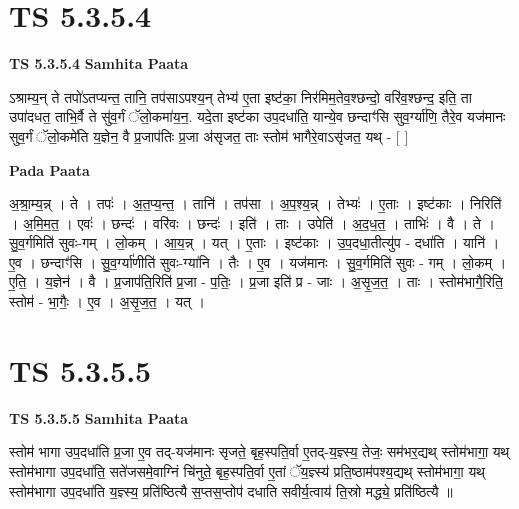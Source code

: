 \documentclass[17pt]{extarticle}
\begin{document}
\section*{ TS 5.3.5.4 }

\textbf{TS 5.3.5.4 } \newline
\textbf{Samhita Paata} \newline

ऽश्राम्य॒न् ते तपो॑ऽतप्यन्त॒ तानि॒ तप॑साऽपश्य॒न् तेभ्य॑ ए॒ता इष्ट॑का॒ निर॑मिम॒तेव॒श्छन्दो॒ वरि॑व॒श्छन्द॒ इति॒ ता उपा॑दधत॒ ताभि॒र्वै ते सु॑व॒र्गं ॅलो॒कमा॑य॒न॒. यदे॒ता इष्ट॑का उप॒दधा॑ति॒ यान्ये॒व छन्दाꣳ॑सि सुव॒र्ग्या॑णि॒ तैरे॒व यज॑मानः सुव॒र्गं ॅलो॒कमे॑ति य॒ज्ञेन॒ वै प्र॒जाप॑तिः प्र॒जा अ॑सृजत॒ ताः स्तोम॑ भागैरे॒वाऽसृ॑जत॒ यथ् - [  ] \newline

\textbf{Pada Paata} \newline

अ॒श्रा॒म्य॒न्न् । ते । तपः॑ । अ॒त॒प्य॒न्त॒ । तानि॑ । तप॑सा । अ॒प॒श्य॒न्न् । तेभ्यः॑ । ए॒ताः । इष्ट॑काः । निरिति॑ । अ॒मि॒म॒त॒ । एवः॑ । छन्दः॑ । वरि॑वः । छन्दः॑ । इति॑ । ताः । उपेति॑ । अ॒द॒ध॒त॒ । ताभिः॑ । वै । ते । सु॒व॒र्गमिति॑ सुवः-गम् । लो॒कम् । आ॒य॒न्न् । यत् । ए॒ताः । इष्ट॑काः । उ॒प॒दधा॒तीत्यु॑प - दधा॑ति । यानि॑ । ए॒व । छन्दाꣳ॑सि । सु॒व॒र्ग्या॑णीति॑ सुवः-ग्या॑नि । तैः । ए॒व । यज॑मानः । सु॒व॒र्गमिति॑ सुवः - गम् । लो॒कम् । ए॒ति॒ । य॒ज्ञेन॑ । वै । प्र॒जाप॑ति॒रिति॑ प्र॒जा - प॒तिः॒ । प्र॒जा इति॑ प्र - जाः । अ॒सृ॒ज॒त॒ । ताः । स्तोम॑भागै॒रिति॒ स्तोम॑ - भा॒गैः॒ । ए॒व । अ॒सृ॒ज॒त॒ । यत् ।  \newline




\section*{ TS 5.3.5.5 }

\textbf{TS 5.3.5.5 } \newline
\textbf{Samhita Paata} \newline

स्तोम॑ भागा उप॒दधा॑ति प्र॒जा ए॒व तद्-यज॑मानः सृजते॒ बृह॒स्पति॒र्वा ए॒तद्-य॒ज्ञ्स्य॒ तेजः॒ सम॑भर॒द्यथ् स्तोम॑भागा॒ यथ् स्तोम॑भागा उप॒दधा॑ति॒ सते॑जसमे॒वाग्निं चि॑नुते॒ बृह॒स्पति॒र्वा ए॒तां ॅय॒ज्ञ्स्य॑ प्रति॒ष्ठाम॑पश्य॒द्यथ् स्तोम॑भागा॒ यथ् स्तोम॑भागा उप॒दधा॑ति य॒ज्ञ्स्य॒ प्रति॑ष्ठित्यै स॒प्तस॒प्तोप॑ दधाति सवीर्य॒त्वाय॑ ति॒स्रो मद्ध्ये॒ प्रति॑ष्ठित्यै ॥ \newline
\end{document}
